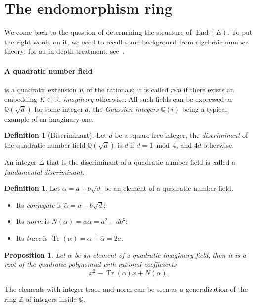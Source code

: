 \documentclass[10pt]{article}
\theoremstyle{plain}
\newtheorem{proposition}[theorem]{Proposition}
\theoremstyle{definition}
\newtheorem{definition}[theorem]{Definition}
\DeclareMathOperator{\End}{End} %
\DeclareMathOperator{\Tr}{Tr} %
\begin{document}
\section{The endomorphism ring}
\label{sec:end(E)}

We come back to the question of determining the structure of
$\End(E)$. %
To put the right words on it, we need to recall some background from
algebraic number theory; for an in-depth treatment,
see~\cite{langANT,Voight2018}.

\paragraph{A quadratic number field} 
is a quadratic extension $K$ of the rationals; it is called
\emph{real} if there exists an embedding $K⊂ℝ$, \emph{imaginary}
otherwise. %
All such fields can be expressed as $ℚ(\sqrt{d})$ for some integer
$d$, the \emph{Gaussian integers} $ℚ(i)$ being a typical example of an
imaginary one. %

\begin{definition}[Discriminant]
  Let $d$ be a square free integer, the \emph{discriminant} of the
  quadratic number field $ℚ(\sqrt{d})$ is $d$ if $d=1\bmod 4$, and
  $4d$ otherwise.
\end{definition}

An integer $Δ$ that is the discriminant of a quadratic number field is
called a \emph{fundamental discriminant}.

\begin{definition}
  Let $α = a + b\sqrt{d}$ be an element of a quadratic number field. %
  \begin{itemize}
  \item Its \emph{conjugate} is $\bar{α} = a - b\sqrt{d}$;
  \item Its \emph{norm} is $N(α) = α\bar{α} = a^2 - db^2$;
  \item Its \emph{trace} is $\Tr(α) = α + \bar{α} = 2a$.
  \end{itemize}
\end{definition}

\begin{proposition}
  Let $α$ be an element of a quadratic imaginary field, then it is a
  root of the quadratic polynomial with rational coefficients
  \[x^2 - \Tr(α)x + N(α).\]
\end{proposition}

The elements with integer trace and norm can be seen as a
generalization of the ring $ℤ$ of integers inside $ℚ$.
\end{document}
